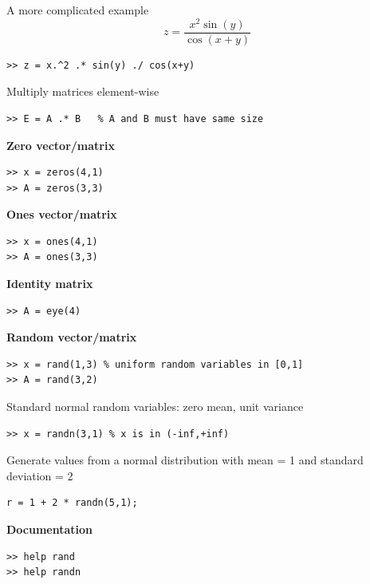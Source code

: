 \documentclass[11pt,xcolor=svgnames,onlymath]{beamer}
\begin{document}
\begin{frame}
A more complicated example
\[
z = \frac{x^2 \sin(y)}{\cos(x+y)}
\]

\begin{lstlisting}
>> z = x.^2 .* sin(y) ./ cos(x+y)
\end{lstlisting}

Multiply matrices element-wise
\begin{lstlisting}
>> E = A .* B   % A and B must have same size
\end{lstlisting}


{\bf Zero vector/matrix}
\begin{lstlisting}
>> x = zeros(4,1)
>> A = zeros(3,3)
\end{lstlisting}

{\bf Ones vector/matrix}
\begin{lstlisting}
>> x = ones(4,1)
>> A = ones(3,3)
\end{lstlisting}

{\bf Identity matrix}
\begin{lstlisting}
>> A = eye(4)
\end{lstlisting}

\pagebreak

{\bf Random vector/matrix}
\begin{lstlisting}
>> x = rand(1,3) % uniform random variables in [0,1]
>> A = rand(3,2)
\end{lstlisting}

Standard normal random variables: zero mean, unit variance
\begin{lstlisting}
>> x = randn(3,1) % x is in (-inf,+inf)
\end{lstlisting}
Generate values from a normal distribution with mean = 1 and standard deviation = 2
\begin{lstlisting}
r = 1 + 2 * randn(5,1);
\end{lstlisting}

{\bf Documentation}
\begin{lstlisting}
>> help rand
>> help randn
\end{lstlisting}

\end{frame}
\end{document}
